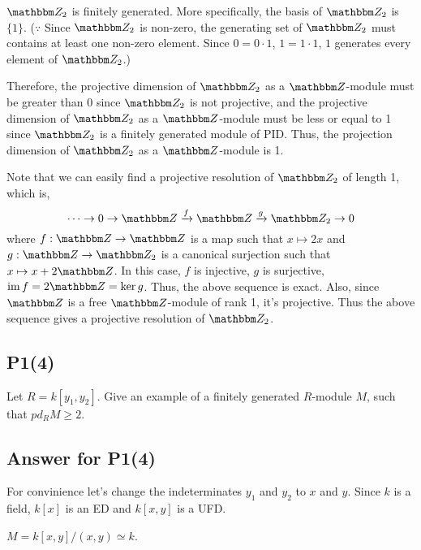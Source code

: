 \(\bbZ_2\) is finitely generated.
More specifically, the basis of \(\bbZ_2\) is \(\{1\}\).
(\(\because\)
Since \(\bbZ_2\) is non-zero, the generating set of \(\bbZ_2\)
must contains at least one non-zero element.
Since \(0 = 0 \cdot 1\), \(1 = 1 \cdot 1\),
\(1\) generates every element of \(\bbZ_2\).)

Therefore,
the projective dimension of \(\bbZ_2\) as a \(\bbZ\)-module
must be greater than 0 since \(\bbZ_2\) is not projective,
and the projective dimension of \(\bbZ_2\) as a \(\bbZ\)-module
must be less or equal to 1 since \(\bbZ_2\) is a finitely generated module of PID.
Thus, the projection dimension of \(\bbZ_2\) as a \(\bbZ\)-module is 1.
\qedsq

Note that we can easily find a projective resolution of \(\bbZ_2\) of length 1,
which is,
\[\cdots \to 0 \to \bbZ \xrightarrow{f} \bbZ \xrightarrow{g} \bbZ_2 \to 0\]
where \(f: \bbZ \to \bbZ\) is a map such that \(x \mapsto 2x\)
and \(g: \bbZ \to \bbZ_2\) is a canonical surjection such that
\(x \mapsto x + 2\bbZ\).
In this case, \(f\) is injective, \(g\) is surjective,
\(\im f = 2\bbZ = \ker g\).
Thus, the above sequence is exact.
Also, since \(\bbZ\) is a free \(\bbZ\)-module of rank 1, it's projective.
Thus the above sequence gives a projective resolution of \(\bbZ_2\).

\subsection*{P1(4)}
Let \(R = k[y_1, y_2]\).
Give an example of a finitely generated \(R\)-module \(M\),
such that \(pd_R M \ge 2\).

\subsection*{Answer for P1(4)}

For convinience let's change the indeterminates \(y_1\) and \(y_2\) to \(x\) and \(y\).
Since \(k\) is a field, \(k[x]\) is an ED and \(k[x, y]\) is a UFD.

\(M = k[x, y] / (x, y) \simeq k\).

